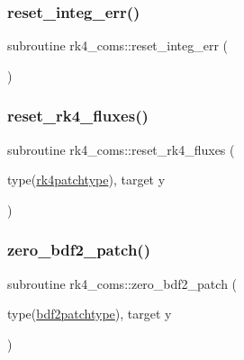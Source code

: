 \subsubsection{\texorpdfstring{reset\+\_\+integ\+\_\+err()}{reset\_integ\_err()}}
{\footnotesize\ttfamily subroutine rk4\+\_\+coms\+::reset\+\_\+integ\+\_\+err (\begin{DoxyParamCaption}{ }\end{DoxyParamCaption})}

\mbox{\label{namespacerk4__coms_a02aeb5f0e99479e6eef3029472a79781}} 
\subsubsection{\texorpdfstring{reset\+\_\+rk4\+\_\+fluxes()}{reset\_rk4\_fluxes()}}
{\footnotesize\ttfamily subroutine rk4\+\_\+coms\+::reset\+\_\+rk4\+\_\+fluxes (\begin{DoxyParamCaption}\item[{type(\hyperlink{structrk4__coms_1_1rk4patchtype}{rk4patchtype}), target}]{y }\end{DoxyParamCaption})}

\mbox{\label{namespacerk4__coms_a4dc0257365f3ec4614c2e41451517e28}} 
\subsubsection{\texorpdfstring{zero\+\_\+bdf2\+\_\+patch()}{zero\_bdf2\_patch()}}
{\footnotesize\ttfamily subroutine rk4\+\_\+coms\+::zero\+\_\+bdf2\+\_\+patch (\begin{DoxyParamCaption}\item[{type(\hyperlink{structrk4__coms_1_1bdf2patchtype}{bdf2patchtype}), target}]{y }\end{DoxyParamCaption})}

\mbox{\label{namespacerk4__coms_a0af8d3f6d5452c98c81c5230f3b22343}} 
